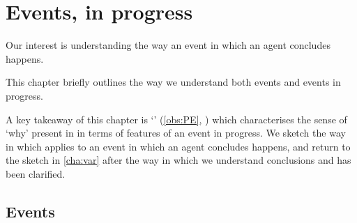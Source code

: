 \chapter{Events, in progress}
\label{cha:events-progress}


\begin{note}
  Our interest is understanding the way an event in which an agent concludes happens.

  This chapter briefly outlines the way we understand both events and events in progress.

  A key takeaway of this chapter is `\progEx{}' (\autoref{obs:PE}, ) which characterises the sense of `why' present in \qWhy{} in terms of features of an event in progress.
  We sketch the way in which \progEx{} applies to an event in which an agent concludes happens, and return to the sketch in \autoref{cha:var} after the way in which we understand conclusions and  has been clarified.
\end{note}


\section{Events}
\label{sec:events}

